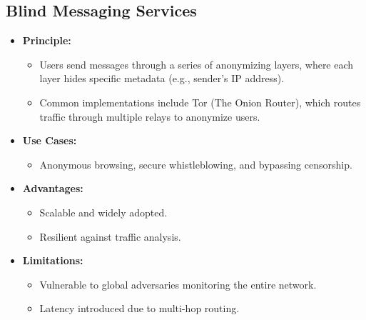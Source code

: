 \documentclass{article}
\begin{document}
\subsection{Blind Messaging Services}
\begin{itemize}
    \item \textbf{Principle:}
    \begin{itemize}
        \item Users send messages through a series of anonymizing layers, where each layer hides specific metadata (e.g., sender's IP address).
        \item Common implementations include Tor (The Onion Router), which routes traffic through multiple relays to anonymize users.
    \end{itemize}
    \item \textbf{Use Cases:}
    \begin{itemize}
        \item Anonymous browsing, secure whistleblowing, and bypassing censorship.
    \end{itemize}
    \item \textbf{Advantages:}
    \begin{itemize}
        \item Scalable and widely adopted.
        \item Resilient against traffic analysis.
    \end{itemize}
    \item \textbf{Limitations:}
    \begin{itemize}
        \item Vulnerable to global adversaries monitoring the entire network.
        \item Latency introduced due to multi-hop routing.
    \end{itemize}
\end{itemize}
\end{document}

